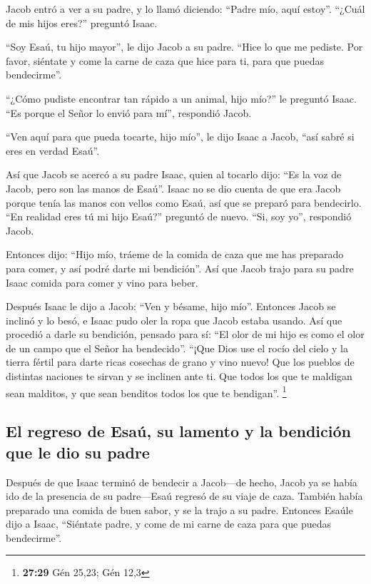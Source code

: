  Jacob entró a ver a su padre, y lo llamó diciendo:
``Padre mío, aquí estoy''. ``¿Cuál de mis hijos eres?'' preguntó Isaac.

 ``Soy Esaú, tu hijo mayor'', le dijo Jacob a su padre.
``Hice lo que me pediste. Por favor, siéntate y come la carne de caza
que hice para ti, para que puedas bendecirme''.

 ``¿Cómo pudiste encontrar tan rápido a un animal, hijo
mío?'' le preguntó Isaac. ``Es porque el Señor lo envió para mí'',
respondió Jacob.

 ``Ven aquí para que pueda tocarte, hijo mío'', le dijo
Isaac a Jacob, ``así sabré si eres en verdad Esaú''.

 Así que Jacob se acercó a su padre Isaac, quien al
tocarlo dijo: ``Es la voz de Jacob, pero son las manos de Esaú''.
 Isaac no se dio cuenta de que era Jacob porque tenía las
manos con vellos como Esaú, así que se preparó para bendecirlo.
 ``En realidad eres tú mi hijo Esaú?'' preguntó de nuevo.
``Si, soy yo'', respondió Jacob.

 Entonces dijo: ``Hijo mío, tráeme de la comida de caza
que me has preparado para comer, y así podré darte mi bendición''. Así
que Jacob trajo para su padre Isaac comida para comer y vino para beber.

 Después Isaac le dijo a Jacob: ``Ven y bésame, hijo
mío''.  Entonces Jacob se inclinó y lo besó, e Isaac pudo
oler la ropa que Jacob estaba usando. Así que procedió a darle su
bendición, pensado para sí: ``El olor de mi hijo es como el olor de un
campo que el Señor ha bendecido''.  ``¡Que Dios use el
rocío del cielo y la tierra fértil para darte ricas cosechas de grano y
vino nuevo!  Que los pueblos de distintas naciones te
sirvan y se inclinen ante ti. Que todos los que te maldigan sean
malditos, y que sean benditos todos los que te bendigan''. \footnote{\textbf{27:29}
  Gén 25,23; Gén 12,3}

\hypertarget{el-regreso-de-esauxfa-su-lamento-y-la-bendiciuxf3n-que-le-dio-su-padre}{%
\subsection{El regreso de Esaú, su lamento y la bendición que le dio su
padre}\label{el-regreso-de-esauxfa-su-lamento-y-la-bendiciuxf3n-que-le-dio-su-padre}}

 Después de que Isaac terminó de bendecir a Jacob---de
hecho, Jacob ya se había ido de la presencia de su padre---Esaú regresó
de su viaje de caza.  También había preparado una comida
de buen sabor, y se la trajo a su padre. Entonces Esaúle dijo a Isaac,
``Siéntate padre, y come de mi carne de caza para que puedas
bendecirme''.

